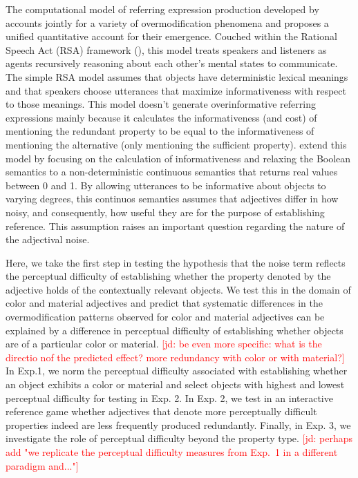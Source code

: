 \documentclass[12pt,letterpaper]{article}
\newcommand{\jd}[1]{\textcolor{Red}{[jd: #1]}}
\begin{document}
The computational model of referring expression production developed by \citet{DegenEtAl2020} accounts jointly for a variety of overmodification phenomena and proposes a unified quantitative account for their emergence. Couched within the Rational Speech Act (RSA) framework (\citealt{Goodman2016}), this model treats speakers and listeners as agents recursively reasoning about each other's mental states to communicate. The simple RSA model assumes that objects have deterministic lexical meanings and that speakers choose utterances that maximize informativeness with respect to those meanings. This model doesn't generate overinformative referring expressions mainly because it calculates the informativeness (and cost) of mentioning the redundant property to be equal to the informativeness of mentioning the alternative (only mentioning the sufficient property). \citet{DegenEtAl2020} extend this model by focusing on the calculation of informativeness and relaxing the Boolean semantics to a non-deterministic continuous semantics that returns real values between 0 and 1. By allowing utterances to be informative about objects to varying degrees, this continuos semantics assumes that adjectives differ in how noisy, and consequently, how useful they are for the purpose of establishing reference. This assumption raises an important question regarding the nature of the adjectival noise. 

Here, we take the first step in testing the hypothesis that the noise term reflects the perceptual difficulty of establishing whether the property denoted by the adjective holds of the contextually relevant objects. We test this in the domain of color and material adjectives and predict that systematic differences in the overmodification patterns observed for color and material adjectives can be explained by a difference in perceptual difficulty of establishing whether objects are of a particular color or material. \jd{be even more specific: what is the directio nof the predicted effect? more redundancy with color or with material?} In Exp.1, we norm the perceptual difficulty associated with establishing whether an object exhibits a color or material and select objects with highest and lowest perceptual difficulty for testing in Exp. 2. In Exp. 2, we test in an interactive reference game whether adjectives that denote more perceptually difficult properties indeed are less frequently produced redundantly. Finally, in Exp. 3, we investigate the role of perceptual difficulty beyond the property type. \jd{perhaps add "we replicate the perceptual difficulty measures from Exp.~1 in a different paradigm and..."}
\end{document}
